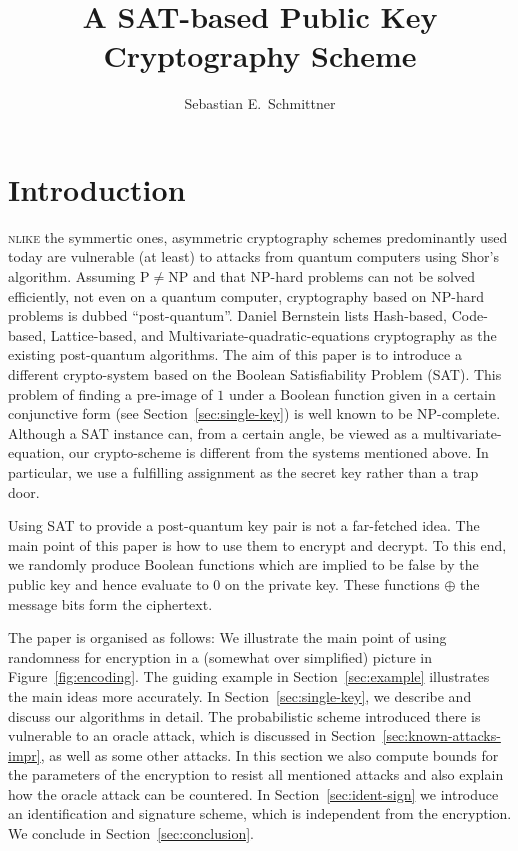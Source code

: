 \documentclass[final,journal,compsoc]{IEEEtran}
\title{A SAT-based Public Key Cryptography Scheme}
\author{Sebastian  E.~Schmittner\IEEEcompsocitemizethanks{\IEEEcompsocthanksitem
  Universit\"at zu K\"oln\par
  Institut f\"ur Theoretische Physik\par
  Z\"ulpicher Stra\ss{}e~77;
  D-50937~K\"oln\par
 \href{mailto:ses@thp.uni-koeln.de}{ses@thp.uni-koeln.de}
  }}
\begin{document}
\maketitle


\section{Introduction\label{sec:introduction}}
\textsc{nlike} the symmertic ones,
asymmetric cryptography schemes
predominantly used today are vulnerable (at least) to attacks from
quantum computers using Shor's algorithm. Assuming P$\neq$NP and that NP-hard problems can not be
solved efficiently, not even on a quantum computer, cryptography based
on NP-hard problems is dubbed ``post-quantum''.
 Daniel Bernstein
\cite{BBD09} lists Hash-based, Code-based,
Lattice-based, and Multivariate-quadratic-equations
cryptography as the existing post-quantum algorithms.  
The aim of this
paper is to introduce a different crypto-system based on
the Boolean Satisfiability Problem (SAT). This problem of finding a
pre-image of $1$ under a Boolean function given in a certain
conjunctive form (see Section~\ref{sec:single-key}) is well known to be NP-complete. Although a SAT
instance can, from a certain angle, be viewed as a
multivariate-equation, our crypto-scheme is different from the
systems mentioned above. In particular, we use a fulfilling assignment
as the secret key rather than a trap door. 

Using SAT to provide a post-quantum key pair is not a
far-fetched idea. The main point of this paper is how to use them to
encrypt and decrypt. To this end, we randomly produce
Boolean functions which are implied to be false by the public key and hence
evaluate to $0$ on the private key. These functions $\oplus$ the
message bits form the ciphertext.

The paper is organised as follows: We illustrate the main point of
using randomness for encryption in a (somewhat over simplified)
picture in Figure~\ref{fig:encoding}.  The guiding example in
Section~\ref{sec:example} illustrates the main ideas more accurately.
In Section~\ref{sec:single-key}, we describe and discuss our
algorithms in detail. The probabilistic scheme introduced there is
vulnerable to an oracle attack, which is discussed in
Section~\ref{sec:known-attacks-impr}, as well as some other
attacks. In this section we also compute bounds for the parameters of
the encryption to resist all mentioned attacks and also explain how
the oracle attack can be countered.  In Section~\ref{sec:ident-sign}
we introduce an identification and signature scheme, which is
independent from the encryption.  We conclude in
Section~\ref{sec:conclusion}.
\end{document}
